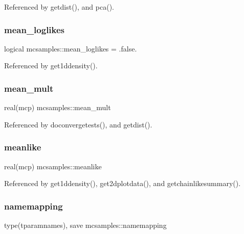 Referenced by getdist(), and pca().

\mbox{\label{namespacemcsamples_a42f921b7349e79466c2128ebcb06e75f}} 
\subsubsection{\texorpdfstring{mean\+\_\+loglikes}{mean\_loglikes}}
{\footnotesize\ttfamily logical mcsamples\+::mean\+\_\+loglikes = .false.}



Referenced by get1ddensity().

\mbox{\label{namespacemcsamples_a1ccd58a9a808001ffe645de8327594a2}} 
\subsubsection{\texorpdfstring{mean\+\_\+mult}{mean\_mult}}
{\footnotesize\ttfamily real(mcp) mcsamples\+::mean\+\_\+mult}



Referenced by doconvergetests(), and getdist().

\mbox{\label{namespacemcsamples_ad9b26e8c7b01068cd5e285b2710ffff9}} 
\subsubsection{\texorpdfstring{meanlike}{meanlike}}
{\footnotesize\ttfamily real(mcp) mcsamples\+::meanlike}



Referenced by get1ddensity(), get2dplotdata(), and getchainlikesummary().

\mbox{\label{namespacemcsamples_ab0b5f836670f80c8acfa3374709ddc9b}} 
\subsubsection{\texorpdfstring{namemapping}{namemapping}}
{\footnotesize\ttfamily type(tparamnames), save mcsamples\+::namemapping}



